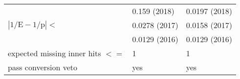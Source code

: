 \begin{table}
\begin{tabular}{lll}
\multirow{3}{*}{$|1/\mathrm{E}-1/\mathrm{p}|<$}   & 0.159 (2018)              & 0.0197 (2018) \\
                                                  & 0.0278 (2017)             & 0.0158 (2017) \\
                                                  & 0.0129 (2016)             & 0.0129 (2016) \\[2mm]
expected missing inner hits $<=$ & 1                            & 1\\[2mm]
pass conversion veto	         & yes                          & yes\\[2mm]
\hline
\end{tabular}
\end{table}
